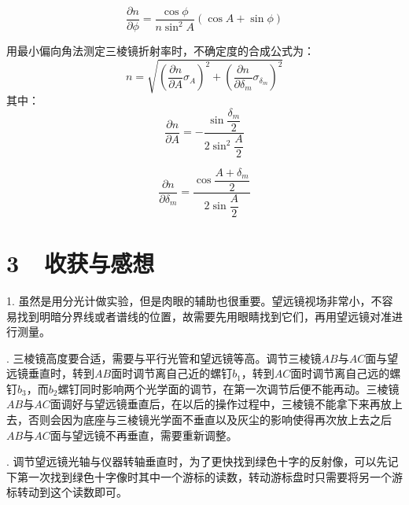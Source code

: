 \documentclass[fontset=windows]{ctexbook}
\begin{document}
\[
\frac{\partial n}{\partial\phi} = \frac{\cos\phi}{n\sin^2 A}(\cos A + \sin\phi)
\]

\medskip
用最小偏向角法测定三棱镜折射率时，不确定度的合成公式为：
\[
n = \sqrt{\left(\frac{\partial n}{\partial A}\sigma_A\right)^2+\left(\frac{\partial n}{\partial\delta_m}\sigma_{\delta_m}\right)^2}
\]
其中：
\[
\frac{\partial n}{\partial A} = -\dfrac{\sin\dfrac{\delta_m}{2}}{2\sin^2 \dfrac{A}{2}}
\]

\[
\frac{\partial n}{\partial\delta_m} = \dfrac{\cos\dfrac{A+\delta_m}{2}}{2\sin \dfrac{A}{2}}
\]

\newpage
\section*{ 3\ \ 收获与感想}
\bigskip

1. 虽然是用分光计做实验，但是肉眼的辅助也很重要。望远镜视场非常小，不容易找到明暗分界线或者谱线的位置，故需要先用眼睛找到它们，再用望远镜对准进行测量。

. 三棱镜高度要合适，需要与平行光管和望远镜等高。调节三棱镜$AB$与$AC$面与望远镜垂直时，转到$AB$面时调节离自己近的螺钉$b_1$，转到$AC$面时调节离自己远的螺钉$b_3$，而$b_2$螺钉同时影响两个光学面的调节，在第一次调节后便不能再动。三棱镜$AB$与$AC$面调好与望远镜垂直后，在以后的操作过程中，三棱镜不能拿下来再放上去，否则会因为底座与三棱镜光学面不垂直以及灰尘的影响使得再次放上去之后$AB$与$AC$面与望远镜不再垂直，需要重新调整。

. 调节望远镜光轴与仪器转轴垂直时，为了更快找到绿色十字的反射像，可以先记下第一次找到绿色十字像时其中一个游标的读数，转动游标盘时只需要将另一个游标转动到这个读数即可。
\end{document}
